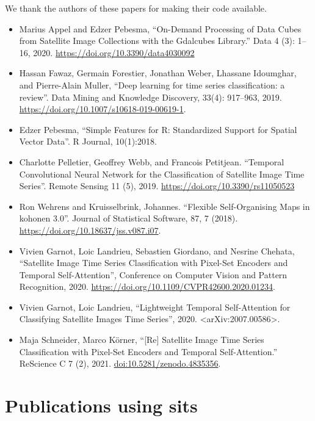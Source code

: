 \documentclass[
  11pt,
]{report}
\begin{document}
We thank the authors of these papers for making their code available.

\begin{itemize}
\item
  Marius Appel and Edzer Pebesma, ``On-Demand Processing of Data Cubes
  from Satellite Image Collections with the Gdalcubes Library.'' Data 4
  (3): 1--16, 2020. \url{https://doi.org/10.3390/data4030092}
\item
  Hassan Fawaz, Germain Forestier, Jonathan Weber, Lhassane Idoumghar,
  and Pierre-Alain Muller, ``Deep learning for time series
  classification: a review''. Data Mining and Knowledge Discovery,
  33(4): 917--963, 2019.
  \url{https://doi.org/10.1007/s10618-019-00619-1}.
\item
  Edzer Pebesma, ``Simple Features for R: Standardized Support for
  Spatial Vector Data''. R Journal, 10(1):2018.
\item
  Charlotte Pelletier, Geoffrey Webb, and Francois Petitjean. ``Temporal
  Convolutional Neural Network for the Classification of Satellite Image
  Time Series''. Remote Sensing 11 (5), 2019.
  \url{https://doi.org/10.3390/rs11050523}
\item
  Ron Wehrens and Kruisselbrink, Johannes. ``Flexible Self-Organising
  Maps in kohonen 3.0''. Journal of Statistical Software, 87, 7 (2018).
  \url{https://doi.org/10.18637/jss.v087.i07}.
\item
  Vivien Garnot, Loic Landrieu, Sebastien Giordano, and Nesrine Chehata,
  ``Satellite Image Time Series Classification with Pixel-Set Encoders
  and Temporal Self-Attention'', Conference on Computer Vision and
  Pattern Recognition, 2020.
  \url{https://doi.org/10.1109/CVPR42600.2020.01234}.
\item
  Vivien Garnot, Loic Landrieu, ``Lightweight Temporal Self-Attention
  for Classifying Satellite Images Time Series'', 2020.
  \textless arXiv:2007.00586\textgreater.
\item
  Maja Schneider, Marco Körner, ``{[}Re{]} Satellite Image Time Series
  Classification with Pixel-Set Encoders and Temporal Self-Attention.''
  ReScience C 7 (2), 2021. \url{doi:10.5281/zenodo.4835356}.
\end{itemize}

\newpage

\hypertarget{publications-using-sits}{%
\section*{Publications using sits}\label{publications-using-sits}}
\end{document}
